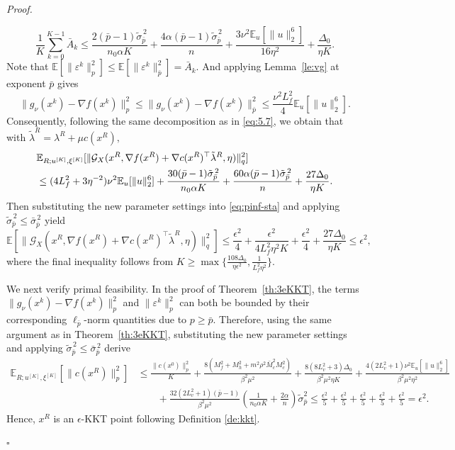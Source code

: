 \documentclass[11pt]{article}
\newenvironment{proof}[1][Proof]{%
    \par\noindent\textit{#1.}\enspace
  }{%
    \hfill\ensuremath{\square}\par
  }%
\numberwithin{equation}{section}
\newcommand{\E}{\mathbb{E}}
\begin{document}
\begin{proof}
\begin{equation}
\frac1K\sum_{k=0}^{K-1}\bar A_k
\leq
\frac{2(\bar p-1)\tilde\sigma_{\bar p}^{\,2}}
     {n_0\alpha K}
+\frac{4\alpha(\bar p-1)\tilde\sigma_{\bar p}^{\,2}}{n}  
+
\frac{3\nu^2\E_u[\|u\|_2^6]}{16\eta^2}
+\frac{\Delta_0}{\eta K}.
\end{equation}
Note that 
 \(\E[\|\varepsilon^k\|_p^2]
    \leq    \E[\|\varepsilon^k\|_{\bar p}^2]
    =\bar A_k.\)
And applying Lemma~\ref{le:vg} at exponent \(\bar p\) gives
\[
    \|g_\nu(x^k)-\nabla f(x^k)\|_p^2
    \leq
    \|g_\nu(x^k)-\nabla f(x^k)\|_{\bar p}^2
    \leq
    \frac{\nu^2L_f^2}{4}\E_u[\|u\|_2^6].
\]
Consequently, following the same decomposition as in
\eqref{eq:5.7}, we obtain that with \(\tilde\lambda^R
    =
    \lambda^R+\mu c(x^R),\)
\begin{align}
&\E_{R;u^{[K]},\xi^{[K]}}
[\|
\mathcal G_X
(
x^R,
\nabla f(x^R)+
\nabla c(x^R)^\top\tilde\lambda^R,
\eta)\|_q^2]                                                \notag\\
&\leq
(4L_f^2+3\eta^{-2})
\nu^2\E_u[\|u\|_2^6]
+\frac{30(\bar p-1)\tilde\sigma_{\bar p}^{\,2}}
       {n_0\alpha K}         
+\frac{60\alpha(\bar p-1)\tilde\sigma_{\bar p}^{\,2}}{n}
+\frac{27\Delta_0}{\eta K}.
\label{eq:pinf-sta}
\end{align}
Then substituting the new parameter settings into \eqref{eq:pinf-sta} and applying  \(\tilde \sigma_{\bar p}^{\,2} \leq \bar\sigma_{\bar p}^{\,2}\) yield
\[\E
[
\|\mathcal G_X(
 x^R,\nabla f(x^R)+\nabla c(x^R)^\top\tilde\lambda^R,\eta
)\|_q^2
]\le
\frac{\epsilon^2}{4}
+\frac{\epsilon^2}{4L_f^2\eta^2K}
+\frac{\epsilon^2}{4}
+\frac{27\Delta_0}{\eta K}
\le\epsilon^2,
\]
where the final inequality follows from
\( K\ge
    \max \{
        \frac{108\Delta_0}{\eta\epsilon^2},
        \frac{1}{L_f^2\eta^2}
     \}.\)

We next verify primal feasibility. In the proof of Theorem~\ref{th:3eKKT}, the terms
\(\|g_\nu(x^k)-\nabla f(x^k)\|_p^2\) and \(\|\varepsilon^k\|_p^2\)
can both be bounded by their corresponding
\(\ell_{\bar p}\)-norm quantities due to $p
\ge \bar p.$ 
Therefore, using the same argument as in Theorem~\ref{th:3eKKT},  substituting the new parameter settings and applying \(\tilde \sigma_{\bar p}^{\,2} \leq \bar\sigma_{\bar p}^{\,2}\) derive
\[\begin{aligned}
\mathbb{E}_{R;u^{[K]},\xi^{[K]}} [\|c(x^R)\|_p^2]  
        &\leq \frac{\|c(x^0)\|_p^2}{K} + \frac{8(M_f^2+M_h^2+m^2\rho^2\bar{M}_c^2M_c^2)}{\beta^2 \mu^2 }
    +\frac{8(8L_v^2+3)\Delta_0}{\beta^2\mu^2\eta K}+\frac{4(2L_v^2+1)\nu^2\E_u[\|u\|_2^6]}{\beta^2\mu^2\eta^2} \\&\qquad+\frac{32(2L_v^2+1)(\bar{p}-1)}{\beta^2\mu^2}(\frac{1}{n_0 \alpha K} + \frac{2\alpha}{n})\tilde \sigma_{\bar{p}}^2\leq \frac{\epsilon^2}{5}+\frac{\epsilon^2}{5}+\frac{\epsilon^2}{5}+\frac{\epsilon^2}{5}+\frac{\epsilon^2}{5}=\epsilon^2.
    \end{aligned}
\]
Hence, \(x^R\) is an
\(\epsilon\)-KKT point following Definition \ref{de:kkt}.


\end{proof}
\end{document}
